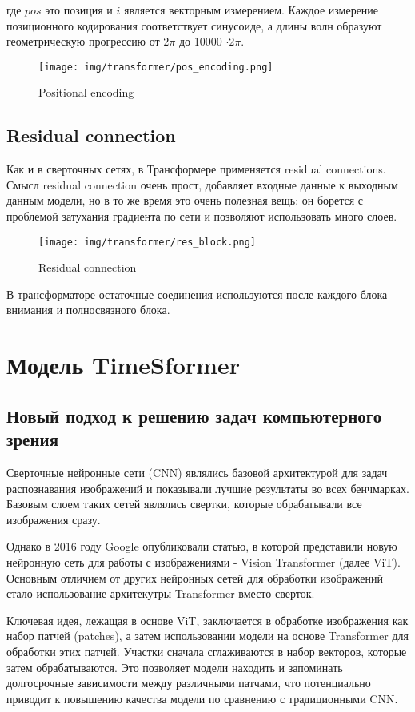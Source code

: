 \documentclass[PMI,KR]{HSEUniversity}
\begin{document}
где $pos$ это позиция и $i$ является векторным измерением. Каждое измерение позиционного кодирования соответствует синусоиде, а длины волн образуют геометрическую прогрессию от $2\pi$ до 10000 $\cdot 2\pi$.

\begin{figure}[h]
    \centering
    \texttt{[image: img/transformer/pos\_encoding.png]}
    \caption{Positional encoding}
\end{figure} 


\subsection{Residual connection} 

Как и в сверточных сетях, в Трансформере применяется residual connections. Смысл residual connection очень прост, добавляет входные данные к выходным данным модели, но в то же время это очень полезная вещь: он борется с проблемой затухания градиента по сети и позволяют использовать много слоев.

\begin{figure}[h]
    \centering
    \texttt{[image: img/transformer/res\_block.png]}
    \caption{Residual connection}
\end{figure}

В трансформаторе остаточные соединения используются после каждого блока внимания и полносвязного блока.

\section{Модель TimeSformer}
\subsection{Новый подход к решению задач компьютерного зрения}

Сверточные нейронные сети (CNN) являлись базовой архитектурой для задач распознавания изображений и показывали лучшие результаты во всех бенчмарках. Базовым слоем таких сетей являлись свертки, которые обрабатывали все изображения сразу.  

Однако в 2016 году Google опубликовали статью, в которой представили новую нейронную сеть для работы с изображениями - Vision Transformer\cite{vit:2016} (далее ViT). Основным отличием от других нейронных сетей для обработки изображений стало использование архитекутры Transformer вместо сверток.

Ключевая идея, лежащая в основе ViT, заключается в обработке изображения как набор патчей (patches), а затем использовании модели на основе Transformer для обработки этих патчей. Участки сначала сглаживаются в набор векторов, которые затем обрабатываются. Это позволяет модели находить и запоминать долгосрочные зависимости между различными патчами, что потенциально приводит к повышению качества модели по сравнению с традиционными CNN.
\end{document}
